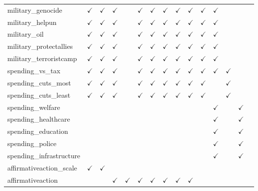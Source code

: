 \documentclass[12pt]{article}
\begin{document}
\begin{table}[H]
{\begin{tabular}{lcccccccccccccl}
military\_genocide & $\checkmark$ & $\checkmark$ & $\checkmark$ &  & $\checkmark$ & $\checkmark$ & $\checkmark$ & $\checkmark$ & $\checkmark$ & $\checkmark$ & $\checkmark$ &  &  & \\
military\_helpun & $\checkmark$ & $\checkmark$ & $\checkmark$ &  & $\checkmark$ & $\checkmark$ & $\checkmark$ & $\checkmark$ & $\checkmark$ & $\checkmark$ & $\checkmark$ &  &  & \\
military\_oil & $\checkmark$ & $\checkmark$ & $\checkmark$ &  & $\checkmark$ & $\checkmark$ & $\checkmark$ & $\checkmark$ & $\checkmark$ & $\checkmark$ & $\checkmark$ &  &  & \\
military\_protectallies & $\checkmark$ & $\checkmark$ & $\checkmark$ &  & $\checkmark$ & $\checkmark$ & $\checkmark$ & $\checkmark$ & $\checkmark$ & $\checkmark$ & $\checkmark$ &  &  & \\
military\_terroristcamp & $\checkmark$ & $\checkmark$ & $\checkmark$ &  & $\checkmark$ & $\checkmark$ & $\checkmark$ & $\checkmark$ & $\checkmark$ & $\checkmark$ & $\checkmark$ &  &  & \\
spending\_vs\_tax & $\checkmark$ & $\checkmark$ & $\checkmark$ &  & $\checkmark$ & $\checkmark$ & $\checkmark$ & $\checkmark$ & $\checkmark$ & $\checkmark$ & $\checkmark$ & $\checkmark$ &  & \\
spending\_cuts\_most & $\checkmark$ & $\checkmark$ & $\checkmark$ &  & $\checkmark$ & $\checkmark$ & $\checkmark$ & $\checkmark$ & $\checkmark$ & $\checkmark$ &  & $\checkmark$ &  & \\
spending\_cuts\_least & $\checkmark$ & $\checkmark$ & $\checkmark$ &  & $\checkmark$ & $\checkmark$ & $\checkmark$ & $\checkmark$ & $\checkmark$ & $\checkmark$ &  & $\checkmark$ &  & \\
spending\_welfare &  &  &  &  &  &  &  &  &  &  & $\checkmark$ &  & $\checkmark$ & \\
spending\_healthcare &  &  &  &  &  &  &  &  &  &  & $\checkmark$ &  & $\checkmark$ & \\
spending\_education &  &  &  &  &  &  &  &  &  &  & $\checkmark$ &  & $\checkmark$ & \\
spending\_police &  &  &  &  &  &  &  &  &  &  & $\checkmark$ &  & $\checkmark$ & \\
spending\_infrastructure &  &  &  &  &  &  &  &  &  &  & $\checkmark$ &  & $\checkmark$ & \\
affirmativeaction\_scale & $\checkmark$ & $\checkmark$ &  &  &  &  &  &  &  &  &  &  &  & \\
affirmativeaction &  &  & $\checkmark$ & $\checkmark$ & $\checkmark$ & $\checkmark$ & $\checkmark$ & $\checkmark$ & $\checkmark$ &  &  &  &  & \\

\end{tabular}}
\end{table}
\end{document}

